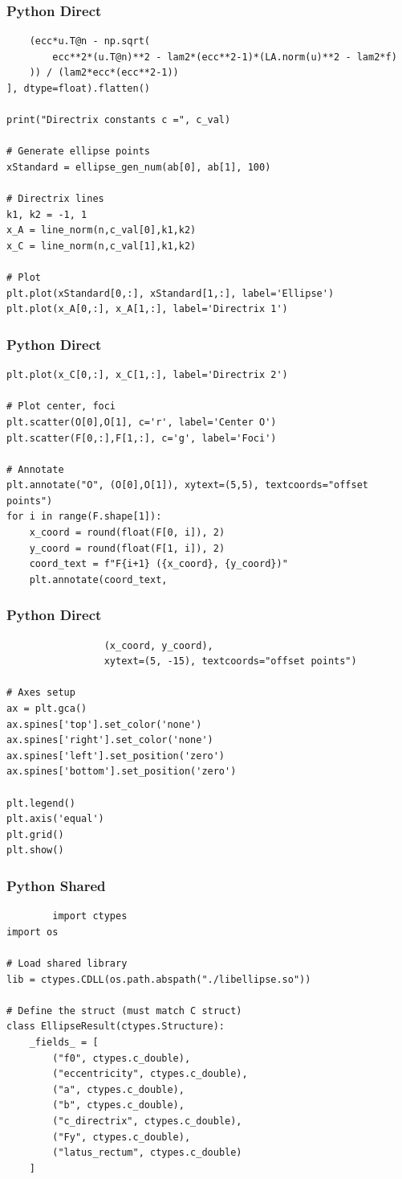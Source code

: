 \documentclass{beamer}
\begin{document}
\begin{frame}[fragile]
    \frametitle{Python Direct}
    \begin{lstlisting}
    (ecc*u.T@n - np.sqrt(
        ecc**2*(u.T@n)**2 - lam2*(ecc**2-1)*(LA.norm(u)**2 - lam2*f)
    )) / (lam2*ecc*(ecc**2-1))
], dtype=float).flatten()

print("Directrix constants c =", c_val)

# Generate ellipse points
xStandard = ellipse_gen_num(ab[0], ab[1], 100)

# Directrix lines
k1, k2 = -1, 1
x_A = line_norm(n,c_val[0],k1,k2)
x_C = line_norm(n,c_val[1],k1,k2)

# Plot
plt.plot(xStandard[0,:], xStandard[1,:], label='Ellipse')
plt.plot(x_A[0,:], x_A[1,:], label='Directrix 1')
\end{lstlisting}
\end{frame}
\begin{frame}[fragile]
    \frametitle{Python Direct}
    \begin{lstlisting}
plt.plot(x_C[0,:], x_C[1,:], label='Directrix 2')

# Plot center, foci
plt.scatter(O[0],O[1], c='r', label='Center O')
plt.scatter(F[0,:],F[1,:], c='g', label='Foci')

# Annotate
plt.annotate("O", (O[0],O[1]), xytext=(5,5), textcoords="offset points")
for i in range(F.shape[1]):
    x_coord = round(float(F[0, i]), 2)
    y_coord = round(float(F[1, i]), 2)
    coord_text = f"F{i+1} ({x_coord}, {y_coord})"
    plt.annotate(coord_text,
    \end{lstlisting}
\end{frame}
\begin{frame}[fragile]
    \frametitle{Python Direct}
    \begin{lstlisting}
                 (x_coord, y_coord),
                 xytext=(5, -15), textcoords="offset points")

# Axes setup
ax = plt.gca()
ax.spines['top'].set_color('none')
ax.spines['right'].set_color('none')
ax.spines['left'].set_position('zero')
ax.spines['bottom'].set_position('zero')

plt.legend()
plt.axis('equal')
plt.grid()
plt.show()

    \end{lstlisting}
\end{frame}
\begin{frame}[fragile]
    \frametitle{Python Shared}
    \begin{lstlisting}
        import ctypes
import os

# Load shared library
lib = ctypes.CDLL(os.path.abspath("./libellipse.so"))

# Define the struct (must match C struct)
class EllipseResult(ctypes.Structure):
    _fields_ = [
        ("f0", ctypes.c_double),
        ("eccentricity", ctypes.c_double),
        ("a", ctypes.c_double),
        ("b", ctypes.c_double),
        ("c_directrix", ctypes.c_double),
        ("Fy", ctypes.c_double),
        ("latus_rectum", ctypes.c_double)
    ]
    \end{lstlisting}
\end{frame}
\end{document}
